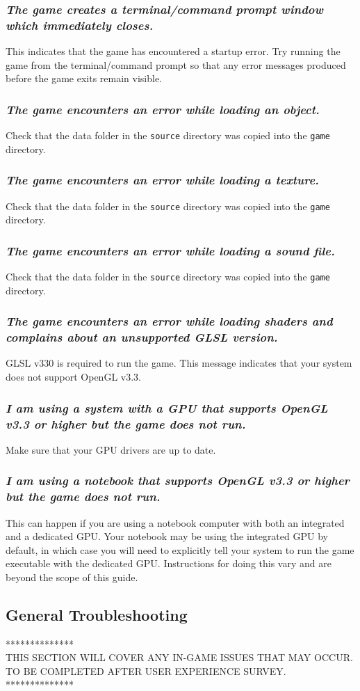 \documentclass[12pt, titlepage]{article}
\begin{document}
\subsubsection{\emph{The game creates a terminal/command prompt window which immediately closes.}}
\noindent This indicates that the game has encountered a startup error.  Try running the game from the terminal/command prompt so that any error messages produced before the game exits remain visible.

\subsubsection{\emph{The game encounters an error while loading an object.}}
\noindent Check that the data folder in the \texttt{source} directory was copied into the \texttt{game} directory.

\subsubsection{\emph{The game encounters an error while loading a texture.}}
\noindent Check that the data folder in the \texttt{source} directory was copied into the \texttt{game} directory.

\subsubsection{\emph{The game encounters an error while loading a sound file.}}
\noindent Check that the data folder in the \texttt{source} directory was copied into the \texttt{game} directory.

\subsubsection{\emph{The game encounters an error while loading shaders and complains about an unsupported GLSL version.}}
\noindent GLSL v330 is required to run the game.  This message indicates that your system does not support OpenGL v3.3.

\subsubsection{\emph{I am using a system with a GPU that supports OpenGL v3.3 or higher but the game does not run.}}
\noindent Make sure that your GPU drivers are up to date.

\subsubsection{\emph{I am using a notebook that supports OpenGL v3.3 or higher but the game does not run.}}
\noindent This can happen if you are using a notebook computer with both an integrated and a dedicated GPU.  Your notebook may be using the integrated GPU by default, in which case you will need to explicitly tell your system to run the game executable with the dedicated GPU.  Instructions for doing this vary and are beyond the scope of this guide.


\subsection{General Troubleshooting}
{\center ***************\\}
\noindent THIS SECTION WILL COVER ANY IN-GAME ISSUES THAT MAY OCCUR.  TO BE COMPLETED AFTER USER EXPERIENCE SURVEY.
{\center ***************\\}
\end{document}
